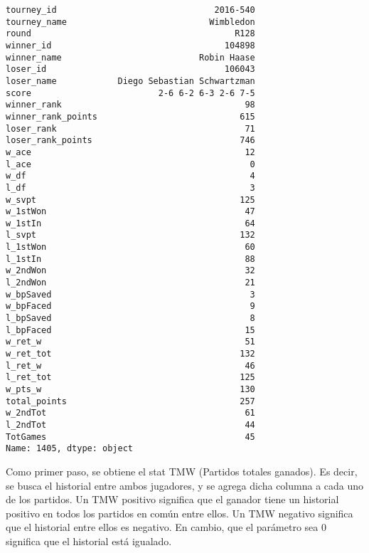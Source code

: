 \documentclass[11pt]{article}
\begin{document}
    
    \begin{verbatim}
tourney_id                               2016-540
tourney_name                            Wimbledon
round                                        R128
winner_id                                  104898
winner_name                           Robin Haase
loser_id                                   106043
loser_name            Diego Sebastian Schwartzman
score                         2-6 6-2 6-3 2-6 7-5
winner_rank                                    98
winner_rank_points                            615
loser_rank                                     71
loser_rank_points                             746
w_ace                                          12
l_ace                                           0
w_df                                            4
l_df                                            3
w_svpt                                        125
w_1stWon                                       47
w_1stIn                                        64
l_svpt                                        132
l_1stWon                                       60
l_1stIn                                        88
w_2ndWon                                       32
l_2ndWon                                       21
w_bpSaved                                       3
w_bpFaced                                       9
l_bpSaved                                       8
l_bpFaced                                      15
w_ret_w                                        51
w_ret_tot                                     132
l_ret_w                                        46
l_ret_tot                                     125
w_pts_w                                       130
total_points                                  257
w_2ndTot                                       61
l_2ndTot                                       44
TotGames                                       45
Name: 1405, dtype: object
    \end{verbatim}

    
    Como primer paso, se obtiene el stat TMW (Partidos totales ganados). Es
decir, se busca el historial entre ambos jugadores, y se agrega dicha
columna a cada uno de los partidos. Un TMW positivo significa que el
ganador tiene un historial positivo en todos los partidos en común entre
ellos. Un TMW negativo significa que el historial entre ellos es
negativo. En cambio, que el parámetro sea 0 significa que el historial
está igualado.
\end{document}
